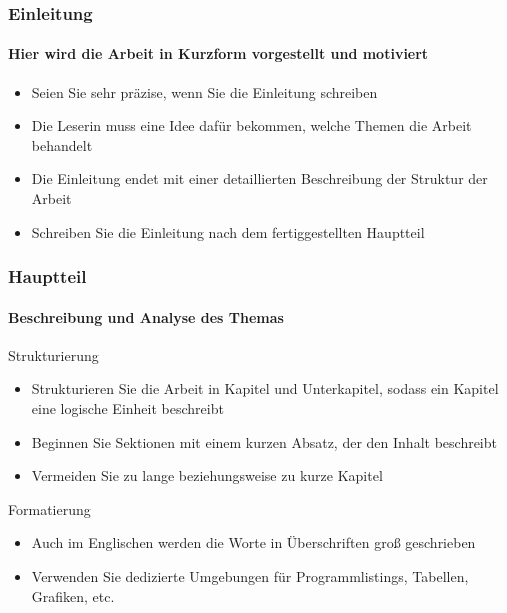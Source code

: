 \begin{frame}
\frametitle{Einleitung}  
\framesubtitle{Hier wird die Arbeit in Kurzform vorgestellt und motiviert}

\begin{itemize}
\item<2-> Seien Sie sehr präzise, wenn Sie die Einleitung schreiben
\item<3-> Die Leserin muss eine Idee dafür bekommen, welche Themen die Arbeit behandelt
\item<4-> Die Einleitung endet mit einer detaillierten Beschreibung der Struktur
der Arbeit
\item<5-> Schreiben Sie die Einleitung nach dem fertiggestellten Hauptteil
\end{itemize}

\medskip
{}
\begin{Beispiel}  
\end{Beispiel}
\end{frame}

\begin{frame}
\frametitle{Hauptteil}  
\framesubtitle{Beschreibung und Analyse des Themas}

\begin{mybox}{Strukturierung}
\begin{itemize}
\item<3-> Strukturieren Sie die Arbeit in Kapitel und Unterkapitel, sodass ein Kapitel
  eine logische Einheit beschreibt
\item<4-> Beginnen Sie Sektionen mit einem kurzen Absatz, der den Inhalt
  beschreibt
\item<5-> Vermeiden Sie zu lange beziehungsweise zu kurze Kapitel
\end{itemize}
\end{mybox}

\bigskip
\begin{mybox}{Formatierung}
  \begin{itemize}
  \item<7-> Auch im Englischen werden die Worte in Überschriften 
groß geschrieben
  \item<8-> Verwenden Sie dedizierte Umgebungen für Programmlistings, Tabellen, Grafiken, etc.
  \end{itemize}
\end{mybox}
\end{frame}

